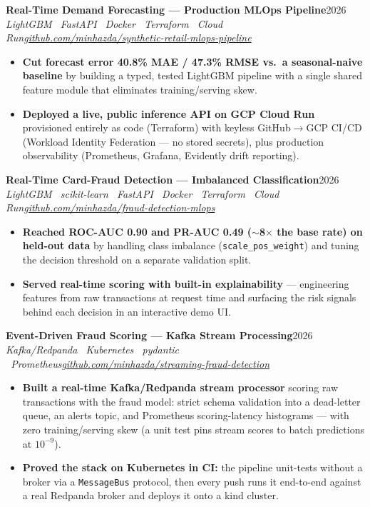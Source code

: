 \documentclass[10pt,a4paper]{article}
\newcommand{\entry}[4]{%
  \textbf{#1}\hfill{\color{muted}\small #2}\\[1pt]
  {\color{accent}\itshape #3}\hfill{\color{muted}\itshape\small #4}\par\vspace{2pt}}
\begin{document}
\entry{Real-Time Demand Forecasting --- Production MLOps Pipeline}{2026}{LightGBM \textperiodcentered\ FastAPI \textperiodcentered\ Docker \textperiodcentered\ Terraform \textperiodcentered\ Cloud Run}{\href{https://github.com/minhazda/synthetic-retail-mlops-pipeline}{github.com/minhazda/synthetic-retail-mlops-pipeline}}
\begin{itemize}
  \item \textbf{Cut forecast error 40.8\% MAE / 47.3\% RMSE vs.\ a seasonal-naive baseline} by building a typed, tested LightGBM pipeline with a single shared feature module that eliminates training/serving skew.
  \item \textbf{Deployed a live, public inference API on GCP Cloud Run} provisioned entirely as code (Terraform) with keyless GitHub$\rightarrow$GCP CI/CD (Workload Identity Federation --- no stored secrets), plus production observability (Prometheus, Grafana, Evidently drift reporting).
\end{itemize}

\entry{Real-Time Card-Fraud Detection --- Imbalanced Classification}{2026}{LightGBM \textperiodcentered\ scikit-learn \textperiodcentered\ FastAPI \textperiodcentered\ Docker \textperiodcentered\ Terraform \textperiodcentered\ Cloud Run}{\href{https://github.com/minhazda/fraud-detection-mlops}{github.com/minhazda/fraud-detection-mlops}}
\begin{itemize}
  \item \textbf{Reached ROC-AUC 0.90 and PR-AUC 0.49 ($\sim$8$\times$ the base rate) on held-out data} by handling class imbalance (\texttt{scale\_pos\_weight}) and tuning the decision threshold on a separate validation split.
  \item \textbf{Served real-time scoring with built-in explainability} --- engineering features from raw transactions at request time and surfacing the risk signals behind each decision in an interactive demo UI.
\end{itemize}

\entry{Event-Driven Fraud Scoring --- Kafka Stream Processing}{2026}{Kafka/Redpanda \textperiodcentered\ Kubernetes \textperiodcentered\ pydantic \textperiodcentered\ Prometheus}{\href{https://github.com/minhazda/streaming-fraud-detection}{github.com/minhazda/streaming-fraud-detection}}
\begin{itemize}
  \item \textbf{Built a real-time Kafka/Redpanda stream processor} scoring raw transactions with the fraud model: strict schema validation into a dead-letter queue, an alerts topic, and Prometheus scoring-latency histograms --- with zero training/serving skew (a unit test pins stream scores to batch predictions at $10^{-9}$).
  \item \textbf{Proved the stack on Kubernetes in CI:} the pipeline unit-tests without a broker via a \texttt{MessageBus} protocol, then every push runs it end-to-end against a real Redpanda broker and deploys it onto a kind cluster.
\end{itemize}
\end{document}
